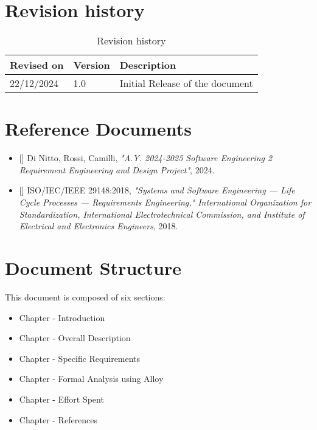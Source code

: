 \section{Revision history}
\label{sec:revision_history}%
\label{sec:definition_acronyms_abbreviations}%
\begin{table}[H]
    \begin{center}
        \begin{tabular}{ |l|l|l|}
            \hline
            \textbf{Revised on} & \textbf{Version}   & \textbf{Description}                           \\
            \hline
            22/12/2024             & 1.0   &   Initial Release of the document  \\
            \hline
         \end{tabular}
         \caption{Revision history}
        \label{tab:acronyms}%
    \end{center}
\end{table}

\setcounter{bib}{1}
\newcommand{\cbib} {\thebib\stepcounter{bib}}

\section{Reference Documents}
\label{sec:reference_documents}
\begin{itemize}
    \item{[\cbib]} Di Nitto, Rossi, Camilli, \textit{"A.Y. 2024-2025 Software Engineering 2 Requirement Engineering and Design Project"}, 2024.
    \item{[\cbib]} ISO/IEC/IEEE 29148:2018, \textit{"Systems and Software Engineering — Life Cycle Processes — Requirements Engineering," International Organization for Standardization, International Electrotechnical Commission, and Institute of Electrical and Electronics Engineers}, 2018.
\end{itemize}

\section{Document Structure}
\label{sec:document_structure}%
This document is composed of six sections:
\begin{itemize}
    \item{}  Chapter - Introduction
    \item{}  Chapter - Overall Description
    \item{}  Chapter - Specific Requirements
    \item{}  Chapter - Formal Analysis using Alloy
    \item{}  Chapter - Effort Spent
    \item{}  Chapter - References
\end{itemize}

